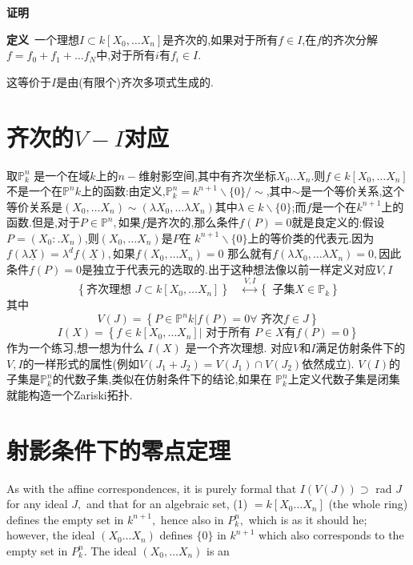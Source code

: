 \documentclass[UTF8]{book}
\begin{document}
		
		\textbf{证明}\ 
		
		
		\textbf{定义}\ 一个理想$I \subset k \left[ X _{0}, \ldots X _{ n }\right]$是齐次的,如果对于所有$f \in I$,在$ f $的齐次分解$f = f _{0}+ f _{1}+\ldots f _{ N }$中,对于所有$ i $有$f _{ i } \in I$.
		
		
		这等价于$ I $是由(有限个)齐次多项式生成的.
		
		
	\section{齐次的$ V-I $对应}
		取$\mathbb{P} ^{n}_{k}$ 是一个在域$ k $上的$ n- $维射影空间,其中有齐次坐标$X _{0} . . X _{ n }$.则$f \in k \left[ X _{0}, \ldots X _{ n }\right]$不是一个在$\mathbb{P} ^{ n } k $上的函数:由定义,$\mathbb{P} ^{ n }_{ k }= k ^{ n +1} \backslash\{0\} / \sim$,其中$\sim$是一个等价关系,这个等价关系是$\left( X _{0}, \ldots X _{ n }\right) \sim\left(\lambda X _{0}, \ldots \lambda X _{ n }\right)$其中$\lambda \in k \backslash\{0\} $;而$ f $是一个在$k ^{n+1}$上的函数.但是,对于$P \in \mathbb{P}^{n} ,$如果$ f $是齐次的,那么条件$f ( P )=0$就是良定义的:假设$P =\left( X _{0}: . X _{ n }\right)$,则$\left(X_{0}, \ldots X_{n}\right)$是$ P $在 $k^{n+1} \backslash\{0\}$上的等价类的代表元.因为$f(\lambda \underline{X})=\lambda^{d} f(\underline{X}),$如果$f\left(X_{0}, \ldots X_{n}\right)=0$ 那么就有$f\left(\lambda X_{0}, \ldots \lambda X_{n}\right)=0,$因此条件$f ( P )=0$是独立于代表元的选取的.出于这种想法像以前一样定义对应$ V,I $
		\begin{equation*}
		\left\{\text {齐次理想 } J \subset k \left[ X _{0}, \dots X _{ n }\right]\right\} \quad \stackrel{ V , I }{\longleftrightarrow}\left\{\text { 子集} X \in \mathbb{P} _{ k }\right\}
		\end{equation*}
		其中
		\begin{equation*}
		V ( J )=\left\{ P \in \mathbb{P} ^{ n } k | f ( P )=0 \forall \text { 齐次} f \in J \right\}
		\end{equation*}
		\begin{equation*}
		I ( X )=\left\{ f \in k \left[ X _{0}, \ldots X _{ n }\right] |  \text { 对于所有 } P \in X \text{有} f ( P )=0\right\}
		\end{equation*}
		作为一个练习,想一想为什么 $I ( X )$ 是一个齐次理想.
		对应$ V $和$ I $满足仿射条件下的$ V,I $的一样形式的属性(例如$V \left( J _{1}+ J _{2}\right)=  V \left( J _{1}\right) \cap V \left( J _{2}\right) $依然成立). $V ( I )$的子集是$\mathbb{P}^{n} _{ k }$的代数子集,类似在仿射条件下的结论,如果在 $\mathbb{P} ^{n}_{k}$上定义代数子集是闭集就能构造一个Zariski拓扑.
		
		
	\section{射影条件下的零点定理}
		 As with the affine correspondences, it is purely formal that $I ( V ( J )) \supset$ rad $J$ for any ideal $J ,$ and that for an algebraic set,
		(1) $= k \left[ X _{0} \ldots X _{ n }\right]$ (the whole ring) defines the empty set in $k ^{ n +1},$ hence also in $P ^{n}_{ k },$ which is as it should he; however, the ideal $\left(X_{0} \ldots X_{n}\right)$ defines $\{0\}$ in $k ^{n+1}$ which also corresponds to the empty set in $P ^{n}_{ k }$. The ideal $\left(X_{0}, \ldots X_{n}\right)$ is an
\end{document}
